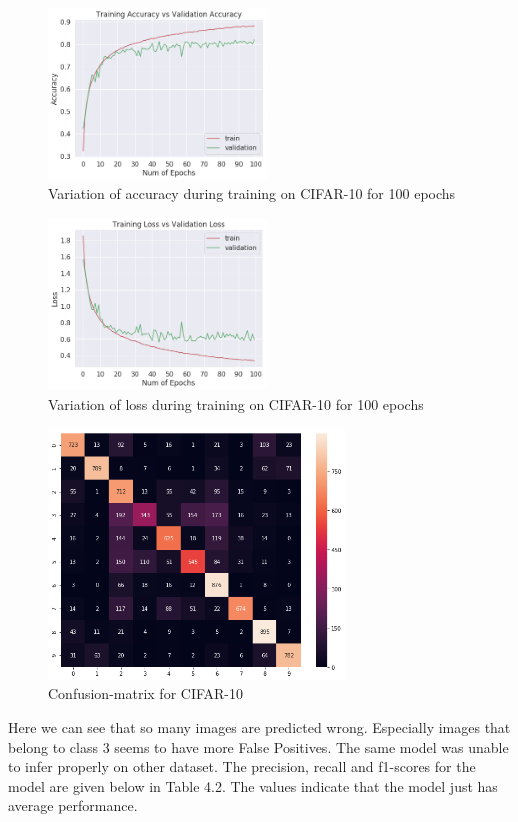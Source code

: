 \begin{figure}[h]
    \centering
    \includegraphics[width=0.52\textwidth]{thesis_template/images/cifacc.png}
    \caption{\small Variation of accuracy during training on CIFAR-10 for 100 epochs}
    \label{}
    \end{figure}

\begin{figure}[h]
    \centering
    \includegraphics[width=0.52\textwidth]{thesis_template/images/cifloss.png}
    \caption{\small Variation of loss during training on CIFAR-10 for 100 epochs}
    \label{}
    \end{figure}
    
\begin{figure}[h]
    \centering
    \includegraphics[width=0.7\textwidth]{thesis_template/images/cmcif.png}
    \caption{\small Confusion-matrix for CIFAR-10}
    \label{}
    \end{figure}
\newpage \noindent Here we can see that so many images are predicted wrong. Especially images that belong to class 3 seems to have more False Positives. The same model was unable to infer properly on other dataset. The precision, recall and f1-scores for the model are given below in Table 4.2. The values indicate that the model just has average performance.


